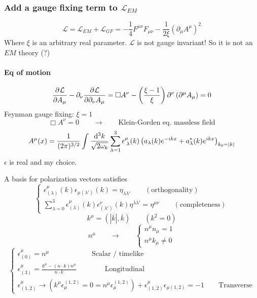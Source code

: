 \subsubsection{Add a gauge fixing term to $\mathcal{L}_{EM}$}
\[ \mathcal{L} = \mathcal{L}_{EM} + \mathcal{L}_{GF} = - \frac{1}{4}F^{\mu\nu}F_{\mu\nu} - \frac{1}{2\xi}\left(\partial_\mu A^\mu\right)^2 \]
Where $\xi$ is an arbitrary real parameter. $\mathcal{L}$ is not gauge invariant! So it is not an $EM$ theory (?)
\paragraph{Eq of motion}
\[  \frac{\partial{^{}}\mathcal{L}}{\partial{{A_\mu}^{}}} - \partial_\nu  \frac{\partial{^{}}\mathcal{L}}{\partial{{\partial_\nu A_\mu}^{}}}  = \Box A^\nu - \left(\frac{\xi-1}{\xi}\right)\partial^\nu \left(\partial^\mu A_\mu\right) = 0 \]
Feynman gauge fixing: $\xi = 1$
\[ \Box A^\nu = 0 \qquad \to \qquad \text{Klein-Gorden eq. massless field} \]
\[ A^\mu(x) = \frac{1}{(2\pi)^{3/2}}\int \frac{\operatorname{d \!}{^3k}}{\sqrt{2\omega_k}}\sum^3_{\lambda=1}\epsilon^\mu_{\;\lambda}(k)\left(a_\lambda(k)e^{-ikx}+a^*_\lambda(k)e^{ikx}\right)_{k_0=|k|} \]
$\epsilon$ is real and my choice.

A basis for polarization vectors satisfies
\[ \begin{cases}
\epsilon^\mu_{(\lambda)}(k)\epsilon_{\mu(\lambda')}(k) = \eta_{\lambda\lambda'} \qquad (\text{orthogonality}) \\
\sum^3_{\lambda=0}\epsilon^\mu_{(\lambda)}(k)\epsilon^\nu_{(\lambda')}(k)\eta^{\lambda\lambda'} = \eta^{\mu\nu} \qquad (\text{completeness})
\end{cases} \]
\[k^\mu = \left(|\overline{k}|, \overline{k}\right) \qquad (k^2 = 0)\]
\[ n^\mu \qquad \to \qquad \begin{cases}
n^\mu n_\mu = 1 \\ n^\mu k_\mu \neq 0
\end{cases} \]
\[ \begin{cases}
\epsilon^\mu_{(0)} = n^\mu \qquad \qquad \qquad \text{Scalar / timelike} \\
\epsilon^\mu_{(3)} = \frac{k^\mu - (n\cdot k)n^\mu}{n\cdot k} \qquad \qquad \text{Longitudinal} \\
\epsilon^\mu_{(1,2)} \to \left(k^\mu\epsilon^{(1,2)}_\mu=0=n^\mu\epsilon^{(1,2)}_\mu\right) + \epsilon^\mu_{(1,2)}\epsilon_{\mu(1,2)} = -1 \qquad \text{Transverse}
\end{cases} \]


